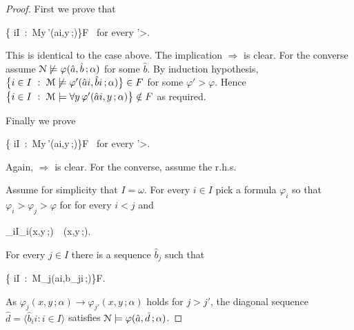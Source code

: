 \documentclass[12pt,letterpaper,oneside,reqno]{amsart}
\theoremstyle{plain}
\theoremstyle{remark}
\begin{document}
\begin{proof}
  First we prove that

  {\Leftrightarrow}
  {\big\{ i\in I\ :\ {\EuScript M}\models\forall y\,\varphi'(\hat ai,y\,;\alpha)\big\}\in F \ \textrm{for every }\varphi'>\varphi.}

  This is identical to the case above.
  The implication $\Rightarrow$ is clear.
  For the converse assume ${\EuScript N}\not\models\varphi(\hat a,\hat b\,; \alpha)$ for some $\hat b$.
  By induction hypothesis, $\big\{ i\in I\ :\ {\EuScript M}\not\models\varphi'(\hat ai,\hat bi\,;\alpha)\big\}\in F$ for some $\varphi'>\varphi$.
  Hence $\big\{ i\in I\ :\ {\EuScript M}\models\forall y\,\varphi'(\hat ai,y\,;\alpha)\big\}\notin F$ as required.
  
  Finally we prove  

  {\Leftrightarrow}
  {\big\{ i\in I\ :\ {\EuScript M}\models\exists y\,\varphi'(\hat ai,y\,;\alpha)\big\}\in F \ \textrm{for every }\varphi'>\varphi.}

  Again, $\Rightarrow$ is clear.
  For the converse, assume the r.h.s.

  Assume for simplicity that $I=\omega$.
  For every $i\in I$ pick a formula $\varphi_i$ so that $\varphi_i>\varphi_j>\varphi$ for for every $i<j$ and

  {\models}
  {\bigwedge_{i\in I}\varphi_i(x,y\,;\alpha)\ \rightarrow\ \varphi(x,y\,;\alpha).}

  For every $j\in I$ there is a sequence $\hat b_j$ such that 

  \ceq{\hfill }
  { } 
  {\big\{ i\in I\ :\ {\EuScript M}\models\varphi_j(\hat ai,\hat b_ji\,;\alpha)\big\}\in F.}

  As $\varphi_j(x,y\,;\alpha)\rightarrow\varphi_{j'}(x,y\,;\alpha)$ holds for $j>j'$, the diagonal sequence $\hat d=\langle \hat b_ii :i\in I\rangle$ satisfies ${\EuScript N}\models\varphi(\hat a,\hat d\,; \alpha)$.

 
\end{proof}
\end{document}
